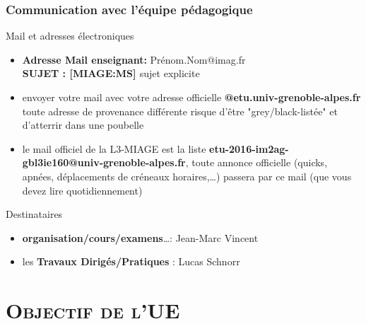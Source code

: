 \documentclass[xcolor=x11names,compress,8pt]{beamer}
\renewcommand{\(}{\begin{columns}}
\renewcommand{\)}{\end{columns}}
\newcommand{\<}[1]{\begin{column}{#1}}
\renewcommand{\>}{\end{column}}
\begin{document}
\begin{frame}
\frametitle{Communication avec l'équipe pédagogique}
\begin{block}{Mail et adresses électroniques}
\begin{itemize}
\item[]  \textbf{Adresse Mail enseignant:} Prénom.Nom@imag.fr\\
\textbf{\alert{SUJET : [MIAGE:MS] }} sujet explicite
\item[] envoyer votre mail avec votre adresse officielle \textbf{@etu.univ-grenoble-alpes.fr}\\
toute adresse de provenance différente risque d'être "grey/black-listée" et d'atterrir dans une poubelle
\item[] le mail officiel de la L3-MIAGE est la liste \textbf{etu-2016-im2ag-gbl3ie160@univ-grenoble-alpes.fr}, toute annonce officielle (quicks, apnées, déplacements de créneaux horaires,…) passera par ce mail (que vous devez lire quotidiennement)
\end{itemize}
\end{block}
\begin{block}{Destinataires}
\begin{itemize}
\item[] \textbf{organisation/cours/examens}…: Jean-Marc Vincent
\item[] les \textbf{Travaux Dirigés/Pratiques} : Lucas Schnorr
\end{itemize}
\end{block}
\end{frame}

\section[{\scshape Objectif}]{{\scshape Objectif de l'UE} }
\end{document}
